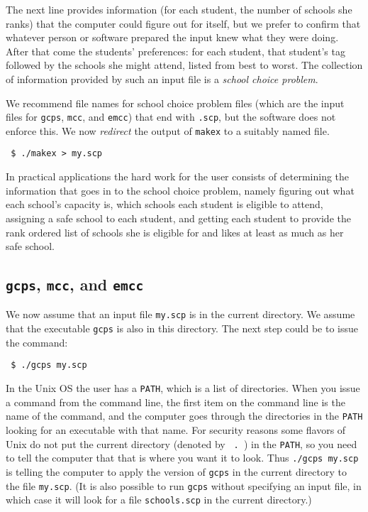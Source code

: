 \documentclass[12pt]{article}
\theoremstyle{definition}
\begin{document}
The next line provides information (for each student, the number of
schools she ranks) that the computer could figure out for itself, but
we prefer to confirm that whatever person or software prepared the
input knew what they were doing.  After that come the students'
preferences: for each student, that student's tag followed by the
schools she might attend, listed from best to worst.  The collection
of information provided by such an input file is a \emph{school choice
problem}.

We recommend file names for school choice problem files (which are the
input files for \texttt{gcps}, \texttt{mcc}, and \texttt{emcc}) that
end with \texttt{.scp}, but the software does not enforce this.  We
now \emph{redirect} the output of \texttt{makex} to a suitably named
file.

\begin{obeylines}\texttt{
    \$ ./makex > my.scp
  }
\end{obeylines}

\bigskip \noindent
In practical applications the hard work for the user consists of
determining the information that goes in to the school choice problem,
namely figuring out what each school's capacity is, which schools each
student is eligible to attend, assigning a safe school to each
student, and getting each student to provide the rank ordered list of
schools she is eligible for and likes at least as much as her safe
school.


\subsection{\texttt{gcps}, \texttt{mcc}, and \texttt{emcc}}

We now assume that  an input file \texttt{my.scp} is
in the current directory.  We assume that the executable \texttt{gcps}
is also in this directory.  The next step could be to issue the
command:
\begin{obeylines}
  \texttt{
    \$ ./gcps my.scp 
    }
\end{obeylines}
\bigskip

In the Unix OS the user has a \texttt{PATH}, which is a list of
directories.  When you issue a command from the command line, the
first item on the command line is the name of the command, and the
computer goes through the directories in the \texttt{PATH} looking for
an executable with that name.  For security reasons some flavors of
Unix do not put the current directory (denoted by \texttt{\ .\ }) in
the \texttt{PATH}, so you need to tell the computer that that is where
you want it to look.  Thus \texttt{./gcps my.scp} is telling the
computer to apply the version of \texttt{gcps} in the current
directory to the file \texttt{my.scp}.  (It is also possible to run
\texttt{gcps} without specifying an input file, in which case it will
look for a file \texttt{schools.scp} in the current directory.)
\end{document}

